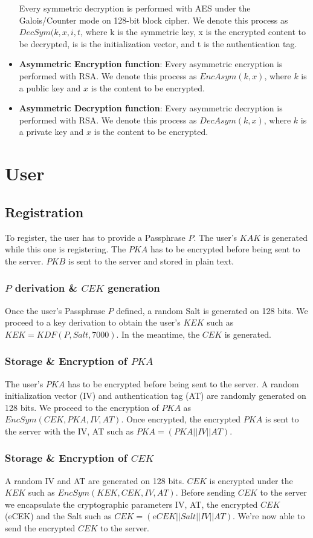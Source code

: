 \documentclass[a4paper,10pt]{article}
\begin{document}
\begin{itemize}
    Every symmetric decryption is performed with AES under the Galois/Counter mode on 128-bit block cipher. We denote this process as $DecSym(k, x, i, t$, where k is the symmetric key, x is the encrypted content to be decrypted, is is the initialization vector, and t is the authentication tag.
    \item \textbf{Asymmetric Encryption function}:
    Every asymmetric encryption is performed with RSA. We denote this process as $EncAsym(k,x)$, where $k$ is a public key and $x$ is the content to be encrypted.
    \item \textbf{Asymmetric Decryption function}:
    Every asymmetric decryption is performed with RSA. We denote this process as $DecAsym(k, x)$, where $k$ is a private key and $x$ is the content to be encrypted.
\end{itemize}

\section{User}
\subsection{Registration}
To register, the user has to provide a Passphrase $P$. The user's $KAK$ is generated while this one is registering. The $PKA$ has to be encrypted before being sent to the server. $PKB$ is sent to the server and stored in plain text.
\subsubsection{$P$ derivation \& $CEK$ generation}
Once the user's Passphrase $P$ defined, a random Salt is generated on 128 bits. We proceed to a key derivation to obtain the user's $KEK$ such as $KEK=KDF(P, Salt, 7000)$. In the meantime, the $CEK$ is generated.
\subsubsection{Storage \& Encryption of $PKA$}
The user's $PKA$ has to be encrypted before being sent to the server. A random initialization vector (IV) and authentication tag (AT) are randomly generated on 128 bits. We proceed to the encryption of $PKA$ as $EncSym(CEK, PKA, IV, AT)$. Once encrypted, the encrypted $PKA$ is sent to the server with the IV, AT such as $PKA=(PKA||IV||AT)$.
\subsubsection{Storage \& Encryption of $CEK$}
A random IV and AT are generated on 128 bits. $CEK$ is encrypted under the $KEK$ such as $EncSym(KEK,CEK, IV, AT)$. Before sending $CEK$ to the server we encapsulate the cryptographic parameters IV, AT, the encrypted $CEK$ (eCEK) and the Salt such as $CEK=(eCEK||Salt||IV||AT)$. We're now able to send the encrypted $CEK$ to the server.
\end{document}
